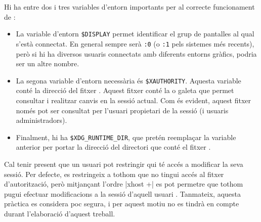 Hi ha entre dos i tres variables d'entorn importants per al correcte funcionament
de  \cite{XrandrVars}:

\begin{itemize}
    \item La variable d'entorn \verb|$DISPLAY| permet identificar el grup de
    pantalles al qual s'està connectat. En general sempre serà \verb|:0| (o 
    \verb|:1| pels sistemes més recents), però si hi ha diversos usuaris
    connectats amb diferents entorns gràfics, podria ser un altre nombre.
    \item La segona variable d'entorn necessària és \verb|$XAUTHORITY|. Aquesta
    variable conté la direcció del fitxer . Aquest fitxer
    conté la  o galeta que permet consultar i realitzar canvis en la sessió
    actual. Com és evident, aquest fitxer només pot ser consultat per l'usuari
    propietari de la sessió (i usuaris administradors).
    \item Finalment, hi ha \verb|$XDG_RUNTIME_DIR|, que pretén reemplaçar la
    variable anterior per portar la direcció del directori que conté el fitxer
    .
\end{itemize}

Cal tenir present que un usuari pot restringir qui té accés a modificar la
seva sessió. Per defecte, es restringeix a tothom que no tingui accés al
fitxer d'autorització, però mitjançant l'ordre \ord|xhost +| es pot permetre
que tothom pugui efectuar modificacions a la sessió d'aquell usuari \cite{Xhost}.
Tanmateix, aquesta pràctica es considera poc segura, i per aquest motiu no es
tindrà en compte durant l'elaboració d'aquest treball.





